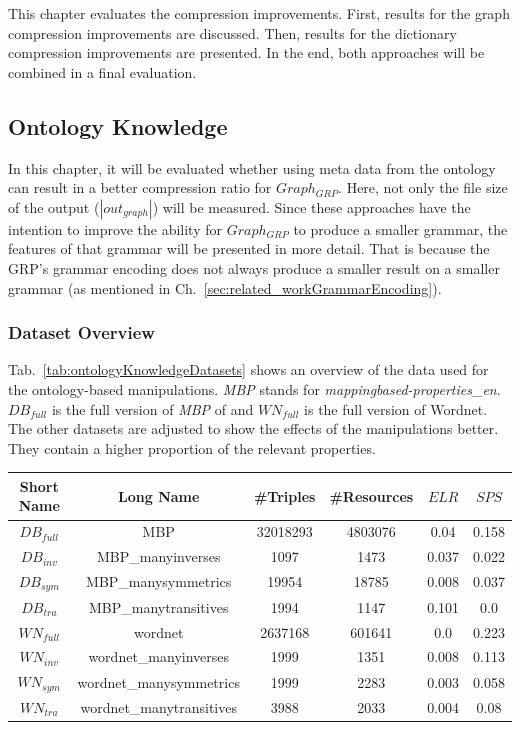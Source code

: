 This chapter evaluates the compression improvements. First, results for the graph compression improvements  are discussed. Then, results for the dictionary compression improvements are presented.  In the end, both approaches will be combined in a final evaluation.

\subsection{Ontology Knowledge}\label{sec:evaluationOntKnowledge}

In this chapter, it will be evaluated whether using meta data from the ontology can result in a better compression ratio for $Graph_{GRP}$. Here, not only the file size of the output ($|out_{graph}|$) will be measured. Since these approaches have the intention to improve the ability for $Graph_{GRP}$ to produce a smaller grammar, the features of that grammar will be presented in more detail. That is because the GRP's grammar encoding does not always produce a smaller result on a smaller grammar (as mentioned in Ch.~\ref{sec:related_workGrammarEncoding}).

\subsubsection{Dataset Overview}

Tab.~\ref{tab:ontologyKnowledgeDatasets} shows an overview of the data used for the ontology-based manipulations. \textit{MBP} stands for \textit{mappingbased-properties\_en}. $DB_{full}$ is the full version of \textit{MBP} of and $WN_{full}$ is the full version of Wordnet. The other datasets are adjusted to show the effects of the manipulations better. They contain a higher proportion of the relevant properties.

\begin{center}
	\begin{tabular}{|c|c|c|c|c|c|}
		\hline 
		Short Name & Long Name & \#Triples & \#Resources & $ELR$ & $SPS$ \\ 
	    \hline
		$DB_{full}$ & MBP& 32018293 & 4803076 & 0.04 & 0.158 \\
		\hline
	    $DB_{inv}$ & MBP\_manyinverses & 1097 & 1473 & 0.037 & 0.022 \\
		\hline
		$DB_{sym}$ & MBP\_manysymmetrics & 19954 & 18785 & 0.008 & 0.037 \\
		\hline
		$DB_{tra}$ & MBP\_manytransitives & 1994 & 1147 & 0.101 & 0.0 \\
		\hline
		\hline
		$WN_{full}$ & wordnet & 2637168 & 601641 & 0.0 & 0.223 \\
		\hline
		$WN_{inv}$ & wordnet\_manyinverses & 1999 & 1351 & 0.008 & 0.113 \\
		\hline
		$WN_{sym}$ & wordnet\_manysymmetrics & 1999 & 2283 & 0.003 & 0.058 \\
		\hline
		$WN_{tra}$ & wordnet\_manytransitives & 3988 & 2033 & 0.004 & 0.08 \\
		\hline
	\end{tabular} 
	\label{tab:ontologyKnowledgeDatasets}
\end{center}

